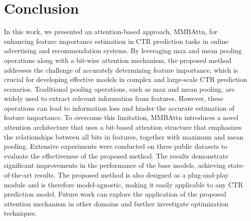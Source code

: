 \documentclass{article}
\begin{document}
\section{Conclusion}

In this work, we presented an attention-based approach, MMBAttn, for enhancing feature importance estimation in CTR prediction tasks in online advertising and recommendation systems. By leveraging max and mean pooling operations along with a bit-wise attention mechanism, the proposed method addresses the challenge of accurately determining feature importance, which is crucial for developing effective models in complex and large-scale CTR prediction scenarios. Traditional pooling operations, such as max and mean pooling, are widely used to extract relevant information from features. However, these operations can lead to information loss and hinder the accurate estimation of feature importance. To overcome this limitation, MMBAttn introduces a novel attention architecture that uses a bit-based attention structure that emphasizes the relationships between all bits in features, together with maximum and mean pooling. Extensive experiments were conducted on three public datasets to evaluate the effectiveness of the proposed method. The results demonstrate significant improvements in the performance of the base models, achieving state-of-the-art results. The proposed method is also designed as a plug-and-play module and is therefore model-agnostic, making it easily applicable to any CTR prediction model.
Future work can explore the application of the proposed attention mechanism in other domains and further investigate optimization techniques.



\end{document}
